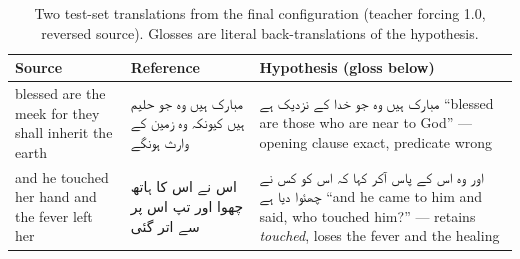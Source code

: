 \begin{table}[t]
\centering
\caption{Two test-set translations from the final configuration (teacher
forcing 1.0, reversed source). Glosses are literal back-translations of
the hypothesis.}
\label{tab:q2examples}
\footnotesize
\begin{tabular}{@{}p{}p{}p{}@{}}
\toprule
\textbf{Source} & \textbf{Reference} & \textbf{Hypothesis (gloss below)} \\
\midrule
blessed are the meek for they shall inherit the earth &
{\urdufont مبارک ہیں وہ جو حلیم ہیں کیونکہ وہ زمین کے وارث ہونگے} &
{\urdufont مبارک ہیں وہ جو خدا کے نزدیک ہے} \newline
``blessed are those who are near to God'' --- opening clause exact,
predicate wrong \\
\addlinespace
and he touched her hand and the fever left her &
{\urdufont اس نے اس کا ہاتھ چھوا اور تپ اس پر سے اتر گئی} &
{\urdufont اور وہ اس کے پاس آکر کہا کہ اس کو کس نے چھئوا دیا ہے} \newline
``and he came to him and said, who touched him?'' --- retains
\emph{touched}, loses the fever and the healing \\
\bottomrule
\end{tabular}
\end{table}
